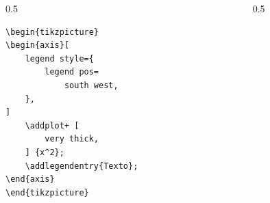 \documentclass[12pt,aspectratio=169,ignorenonframetext]{ltxbeamer}
\begin{document}
\begin{frame}[fragile]
\bigskip

\begin{columns}
    \begin{column}{0.5\textwidth}
        \begin{verbatim}
\begin{tikzpicture}
\begin{axis}[
    legend style={
        legend pos=
            south west,
    },
]
    \addplot+ [
        very thick,
    ] {x^2};
    \addlegendentry{Texto};
\end{axis}
\end{tikzpicture}
        \end{verbatim}
    \end{column}
    {\color{gray} \vline}
    \begin{column}{0.5\textwidth}
        \lmr
    \end{column}
\end{columns}
\end{frame}
\end{document}
